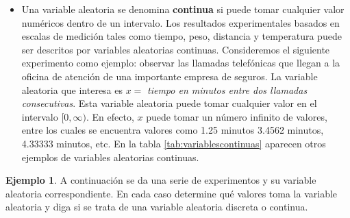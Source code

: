 \documentclass[
]{book}
\providecommand{\tightlist}{%
  \setlength{\itemsep}{0pt}\setlength{\parskip}{0pt}}
\theoremstyle{definition}
\theoremstyle{definition}
\newtheorem{example}{Ejemplo}[chapter]
\theoremstyle{definition}
\theoremstyle{definition}
\theoremstyle{remark}
\begin{document}
\begin{itemize}
\tightlist
\item
  Una variable aleatoria se denomina \textbf{continua} si puede tomar cualquier valor numéricos dentro de un intervalo. Los resultados experimentales basados en escalas de medición tales como tiempo, peso, distancia y temperatura puede ser descritos por variables aleatorias continuas. Consideremos el siguiente experimento como ejemplo: observar las llamadas telefónicas que llegan a la oficina de atención de una importante empresa de seguros. La variable aleatoria que interesa es \(x =\) \emph{tiempo en minutos entre dos llamadas consecutivas}. Esta variable aleatoria puede tomar cualquier valor en el intervalo \([0, \infty)\). En efecto, \(x\) puede tomar un número infinito de valores, entre los cuales se encuentra valores como 1.25 minutos 3.4562 minutos, 4.33333 minutos, etc. En la tabla \ref{tab:variablescontinuas} aparecen otros ejemplos de variables aleatorias continuas.
\end{itemize}

\begin{table}[H]

\caption{\label{tab:variablescontinuas}Ejemplos de variables aleatorias discretas}
\centering
{}
\end{table}

\begin{example}
A continuación se da una serie de experimentos y su variable aleatoria correspondiente. En cada caso determine qué valores toma la variable aleatoria y diga si se trata de una variable aleatoria discreta o continua.
\end{example}
\end{document}
